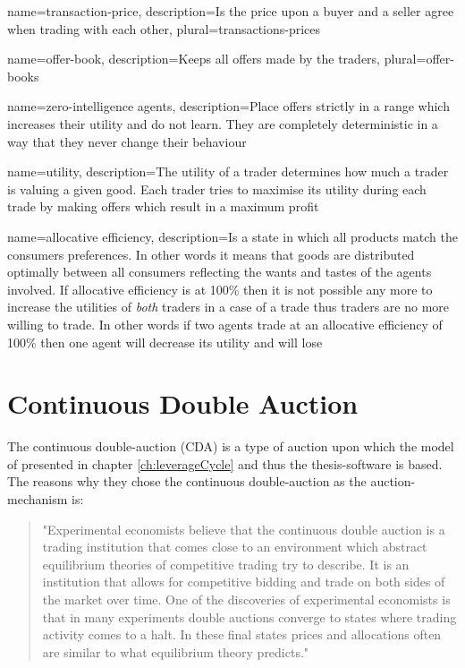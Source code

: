 \documentclass[../Bachelorarbeit.tex]{subfiles}
\begin{document}
 {
	name=transaction-price,
	description={Is the price upon a buyer and a seller agree when trading with each other},
	plural=transactions-prices
}

 {
	name=offer-book,
	description={Keeps all offers made by the traders},
	plural=offer-books
}

 {
	name=zero-intelligence agents,
	description={Place offers strictly in a range which increases their utility and do not learn. They are completely deterministic in a way that they never change their behaviour}
}

 {
	name=utility,
	description={The utility of a trader determines how much a trader is valuing a given good. Each trader tries to maximise its utility during each trade by making offers which result in a maximum profit}
}

 {
	name=allocative efficiency,
	description={Is a state in which all products match the consumers preferences. In other words it means that goods are distributed optimally between all consumers reflecting the wants and tastes of the agents involved. If allocative efficiency is at 100\% then it is not possible any more to increase the utilities of \textit{both} traders in a case of a trade thus traders are no more willing to trade. In other words if two agents trade at an allocative efficiency of 100\% then one agent will decrease its utility and will lose}
}

\section{Continuous Double Auction}	
The continuous double-auction (CDA) is a type of auction upon which the model of \cite{Breuer2015} presented in chapter \ref{ch:leverageCycle} and thus the thesis-software is based. The reasons why they chose the continuous double-auction as the auction-mechanism is:

\begin{quote}
"Experimental economists believe that the continuous double auction is a trading institution that comes close to an environment which abstract equilibrium theories of competitive trading try to describe. It is an institution that allows for competitive bidding and trade on both sides of the market over time. One of the discoveries of experimental economists is that in many experiments double auctions converge to states where trading activity comes to a halt. In these final states prices and allocations often are similar to what equilibrium theory predicts." \cite{Breuer2015}
\end{quote}
\end{document}

